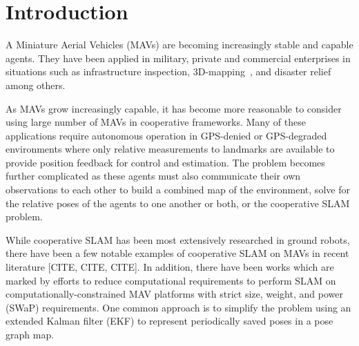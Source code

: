
\section{Introduction}
A Miniature Aerial Vehicles (MAVs) are becoming increasingly stable and capable agents. They have been applied in military, private and commercial enterprises in situations such as infrastructure inspection\cite{Steich2016, Ham2016}, 3D-mapping~\cite{Remondino2011}, and disaster relief\cite{Adams2011} among others.

As MAVs grow increasingly capable, it has become more reasonable to consider using large number of MAVs in cooperative frameworks. Many of these applications require autonomous operation in GPS-denied or GPS-degraded environments where only relative measurements to landmarks are available to provide position feedback for control and estimation.  The problem becomes further complicated as these agents must also communicate their own observations to each other to build a combined map of the environment, solve for the relative poses of the agents to one another or both, or the cooperative SLAM problem.

While cooperative SLAM has been most extensively researched in ground robots, there have been a few notable examples of cooperative SLAM on MAVs in recent literature [CITE, CITE, CITE].  In addition, there have been works which are marked by efforts to reduce computational requirements to perform SLAM on computationally-constrained MAV platforms with strict size, weight, and power (SWaP) requirements.  One common approach is to simplify the problem using an extended Kalman filter (EKF) to represent periodically saved poses in a pose graph map.

